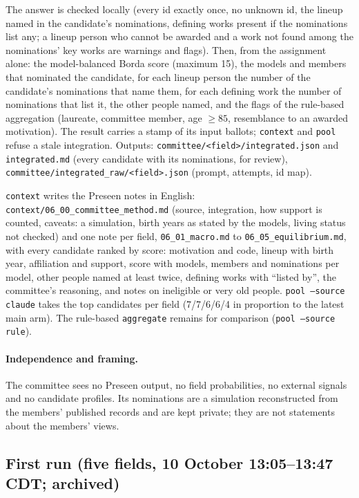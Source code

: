 \documentclass[11pt,a4paper]{article}
\newcommand{\code}[1]{\texttt{#1}}
\begin{document}
The answer is checked locally (every id exactly once, no unknown id, the lineup named in the candidate's nominations,
defining works present if the nominations list any; a lineup person who cannot be awarded and a work not found among
the nominations' key works are warnings and flags). Then, from the assignment alone: the model-balanced Borda score
(maximum 15), the models and members that nominated the candidate, for each lineup person the number of the
candidate's nominations that name them, for each defining work the number of nominations that list it, the other
people named, and the flags of the rule-based aggregation (laureate, committee member, age $\geq 85$, resemblance to an
awarded motivation). The result carries a stamp of its input ballots; \code{context} and \code{pool} refuse a stale
integration. Outputs: \code{committee/<field>/integrated.json} and \code{integrated.md} (every candidate with its
nominations, for review), \code{committee/integrated\_raw/<field>.json} (prompt, attempts, id map).

\code{context} writes the Preseen notes in English: \code{context/06\_00\_committee\_method.md} (source, integration,
how support is counted, caveats: a simulation, birth years as stated by the models, living status not checked) and one
note per field, \code{06\_01\_macro.md} to \code{06\_05\_equilibrium.md}, with every candidate ranked by score:
motivation and code, lineup with birth year, affiliation and support, score with models, members and nominations per
model, other people named at least twice, defining works with ``listed by'', the committee's reasoning, and notes on
ineligible or very old people. \code{pool --source claude} takes the top candidates per field (7/7/6/6/4 in proportion
to the latest main arm). The rule-based \code{aggregate} remains for comparison (\code{pool --source rule}).

\paragraph{Independence and framing.} The committee sees no Preseen output, no field probabilities, no external
signals and no candidate profiles. Its nominations are a simulation reconstructed from the members' published records
and are kept private; they are not statements about the members' views.

\subsection{First run (five fields, 10 October 13:05--13:47 CDT; archived)}
\end{document}
